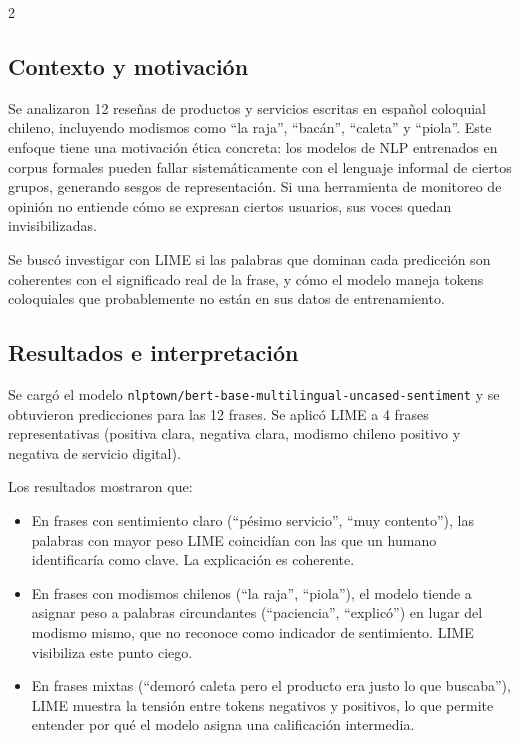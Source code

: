 \documentclass[12pt, a4paper]{article}
\begin{document}
\begin{multicols}{2}
\subsection{Contexto y motivación}

Se analizaron 12 reseñas de productos y servicios escritas en español coloquial chileno, incluyendo modismos como ``la raja'', ``bacán'', ``caleta'' y ``piola''. Este enfoque tiene una motivación ética concreta: los modelos de NLP entrenados en corpus formales pueden fallar sistemáticamente con el lenguaje informal de ciertos grupos, generando sesgos de representación. Si una herramienta de monitoreo de opinión no entiende cómo se expresan ciertos usuarios, sus voces quedan invisibilizadas.

Se buscó investigar con LIME si las palabras que dominan cada predicción son coherentes con el significado real de la frase, y cómo el modelo maneja tokens coloquiales que probablemente no están en sus datos de entrenamiento.

\subsection{Resultados e interpretación}

Se cargó el modelo \texttt{nlptown/bert-base-multilingual-uncased-sentiment} y se obtuvieron predicciones para las 12 frases. Se aplicó LIME a 4 frases representativas (positiva clara, negativa clara, modismo chileno positivo y negativa de servicio digital).

Los resultados mostraron que:

\begin{itemize}[leftmargin=1.5em, itemsep=2pt]
    \item En frases con sentimiento claro (``pésimo servicio'', ``muy contento''), las palabras con mayor peso LIME coincidían con las que un humano identificaría como clave. La explicación es coherente.
    \item En frases con modismos chilenos (``la raja'', ``piola''), el modelo tiende a asignar peso a palabras circundantes (``paciencia'', ``explicó'') en lugar del modismo mismo, que no reconoce como indicador de sentimiento. LIME visibiliza este punto ciego.
    \item En frases mixtas (``demoró caleta pero el producto era justo lo que buscaba''), LIME muestra la tensión entre tokens negativos y positivos, lo que permite entender por qué el modelo asigna una calificación intermedia.
\end{itemize}


\end{multicols}
\end{document}
